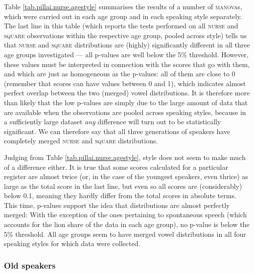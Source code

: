 Table \ref{tab.pillai.nurse.agestyle} summarises the results of a number of \textsc{manova}s, which were carried out in each age group and in each speaking style separately.
The last line in this table (which reports the tests performed on all \textsc{nurse} and \textsc{square} observations within the respective age group, pooled across style) tells us that \textsc{nurse} and \textsc{square} distributions are (highly) significantly different in all three age groups investigated --- all p-values are well below the 5\% threshold.
However, these values must be interpreted in connection with the  scores that go with them, and which are just as homogeneous as the p-values: all of them are close to 0 (remember that  scores can have values between 0 and 1), which indicates almost perfect overlap between the two (merged) vowel distributions.
It is therefore more than likely that the low p-values are simply due to the large amount of data that are available when the observations are pooled across speaking styles, because in a sufficiently large dataset \emph{any} difference will turn out to be statistically significant.
We can therefore say that all three generations of speakers have completely merged \textsc{nurse} and \textsc{square} distributions.

Judging from Table \ref{tab.pillai.nurse.agestyle}, style does not seem to make much of a difference either.
It is true that some  scores calculated for a particular register are almost twice (or, in the case of the youngest speakers, even thrice) as large as the total score in the last line, but even so all  scores are (considerably) below 0.1, meaning they hardly differ from the total scores in absolute terms.
This time, p-values support the idea that distributions are almost perfectly merged: With the exception of the ones pertaining to spontaneous speech (which accounts for the lion share of the data in each age group), no p-value is below the 5\% threshold.
All age groups seem to have merged vowel distributions in all four speaking styles for which data were collected.

\subsubsection{Old speakers}


